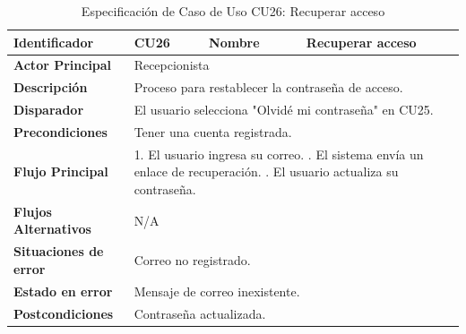 \vspace{0.6cm}




\begingroup
\setlength{\parskip}{0pt}
\begin{longtable}{|p{3.5cm}|p{2cm}|p{2.5cm}|p{7cm}|}
\caption{Especificación de Caso de Uso CU26: Recuperar acceso}
\label{tab:cu26} \\
\hline
\textbf{Identificador} & CU26 & \textbf{Nombre} & Recuperar acceso \\ \hline
\textbf{Actor Principal} & \multicolumn{3}{p{11.5cm}|}{Recepcionista} \\ \hline
\textbf{Descripción} & \multicolumn{3}{p{11.5cm}|}{Proceso para restablecer la contraseña de acceso.} \\ \hline
\textbf{Disparador} & \multicolumn{3}{p{11.5cm}|}{El usuario selecciona "Olvidé mi contraseña" en CU25.} \\ \hline
\textbf{Precondiciones} & \multicolumn{3}{p{11.5cm}|}{Tener una cuenta registrada.} \\ \hline
\textbf{Flujo Principal} & \multicolumn{3}{p{11.5cm}|}{1. El usuario ingresa su correo. \newline 2. El sistema envía un enlace de recuperación. \newline 3. El usuario actualiza su contraseña.} \\ \hline
\textbf{Flujos Alternativos} & \multicolumn{3}{p{11.5cm}|}{N/A} \\ \hline
\textbf{Situaciones de error} & \multicolumn{3}{p{11.5cm}|}{Correo no registrado.} \\ \hline
\textbf{Estado en error} & \multicolumn{3}{p{11.5cm}|}{Mensaje de correo inexistente.} \\ \hline
\textbf{Postcondiciones} & \multicolumn{3}{p{11.5cm}|}{Contraseña actualizada.} \\ \hline
\end{longtable}
\endgroup

\vspace{0.8cm}

